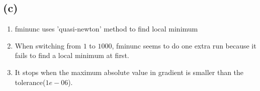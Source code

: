\documentclass{article}
\begin{document}
\subsection*{(c)}

\begin{enumerate}[label= \roman*.]
    \item fminunc uses 'quasi-newton' method to find local minimum
    \item When switching from $1$ to $1000$, fminunc seems to do one extra run because it fails to find a local minimum at first.
    \item It stops when the maximum absolute value in gradient is smaller than the tolerance($1e-06$).
\end{enumerate}
\end{document}
